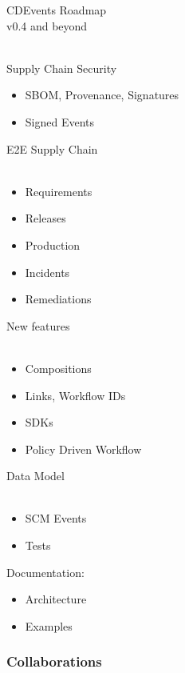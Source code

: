 \documentclass[aspectratio=169,11pt,hyperref={colorlinks=true}]{beamer}
\begin{document}
\begin{stripedframe}%
  {%
  CDEvents Roadmap \\
  v0.4 and beyond \\
  ~
  }%
  {%
  Supply Chain Security
  \begin{itemize}
    \item SBOM, Provenance, Signatures
  \end{itemize}
  \begin{itemize}
    \item Signed Events
  \end{itemize}
  }%
  {%
  E2E Supply Chain \\
  ~
  \begin{itemize}
    \item Requirements
    \item Releases
    \item Production
    \item Incidents
    \item Remediations
  \end{itemize}
  }%
  {%
  New features \\
  ~
  \begin{itemize}
    \item Compositions
    \item Links, Workflow IDs
    \item SDKs
    \item Policy Driven Workflow
  \end{itemize}
  }%
  {%
  Data Model \\
  ~
  \begin{itemize}
    \item SCM Events
    \item Tests
  \end{itemize}
  Documentation:
  \begin{itemize}
    \item Architecture
    \item Examples
  \end{itemize}
  }%
\end{stripedframe}

\begin{blackframe}
  \frametitle{Collaborations}
\end{blackframe}
\end{document}

